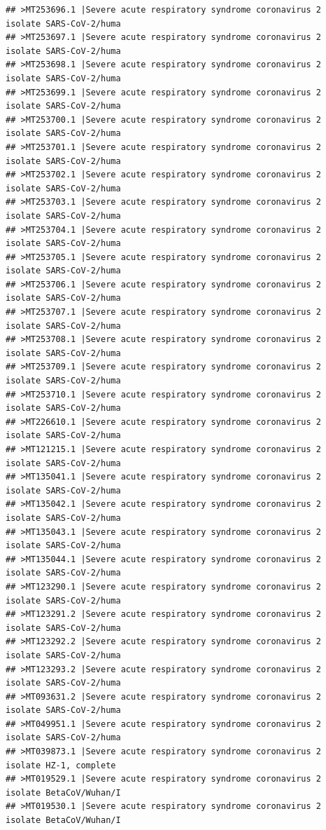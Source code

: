 \documentclass[
]{book}
\begin{document}
\begin{verbatim}
## >MT253696.1 |Severe acute respiratory syndrome coronavirus 2 isolate SARS-CoV-2/huma
## >MT253697.1 |Severe acute respiratory syndrome coronavirus 2 isolate SARS-CoV-2/huma
## >MT253698.1 |Severe acute respiratory syndrome coronavirus 2 isolate SARS-CoV-2/huma
## >MT253699.1 |Severe acute respiratory syndrome coronavirus 2 isolate SARS-CoV-2/huma
## >MT253700.1 |Severe acute respiratory syndrome coronavirus 2 isolate SARS-CoV-2/huma
## >MT253701.1 |Severe acute respiratory syndrome coronavirus 2 isolate SARS-CoV-2/huma
## >MT253702.1 |Severe acute respiratory syndrome coronavirus 2 isolate SARS-CoV-2/huma
## >MT253703.1 |Severe acute respiratory syndrome coronavirus 2 isolate SARS-CoV-2/huma
## >MT253704.1 |Severe acute respiratory syndrome coronavirus 2 isolate SARS-CoV-2/huma
## >MT253705.1 |Severe acute respiratory syndrome coronavirus 2 isolate SARS-CoV-2/huma
## >MT253706.1 |Severe acute respiratory syndrome coronavirus 2 isolate SARS-CoV-2/huma
## >MT253707.1 |Severe acute respiratory syndrome coronavirus 2 isolate SARS-CoV-2/huma
## >MT253708.1 |Severe acute respiratory syndrome coronavirus 2 isolate SARS-CoV-2/huma
## >MT253709.1 |Severe acute respiratory syndrome coronavirus 2 isolate SARS-CoV-2/huma
## >MT253710.1 |Severe acute respiratory syndrome coronavirus 2 isolate SARS-CoV-2/huma
## >MT226610.1 |Severe acute respiratory syndrome coronavirus 2 isolate SARS-CoV-2/huma
## >MT121215.1 |Severe acute respiratory syndrome coronavirus 2 isolate SARS-CoV-2/huma
## >MT135041.1 |Severe acute respiratory syndrome coronavirus 2 isolate SARS-CoV-2/huma
## >MT135042.1 |Severe acute respiratory syndrome coronavirus 2 isolate SARS-CoV-2/huma
## >MT135043.1 |Severe acute respiratory syndrome coronavirus 2 isolate SARS-CoV-2/huma
## >MT135044.1 |Severe acute respiratory syndrome coronavirus 2 isolate SARS-CoV-2/huma
## >MT123290.1 |Severe acute respiratory syndrome coronavirus 2 isolate SARS-CoV-2/huma
## >MT123291.2 |Severe acute respiratory syndrome coronavirus 2 isolate SARS-CoV-2/huma
## >MT123292.2 |Severe acute respiratory syndrome coronavirus 2 isolate SARS-CoV-2/huma
## >MT123293.2 |Severe acute respiratory syndrome coronavirus 2 isolate SARS-CoV-2/huma
## >MT093631.2 |Severe acute respiratory syndrome coronavirus 2 isolate SARS-CoV-2/huma
## >MT049951.1 |Severe acute respiratory syndrome coronavirus 2 isolate SARS-CoV-2/huma
## >MT039873.1 |Severe acute respiratory syndrome coronavirus 2 isolate HZ-1, complete
## >MT019529.1 |Severe acute respiratory syndrome coronavirus 2 isolate BetaCoV/Wuhan/I
## >MT019530.1 |Severe acute respiratory syndrome coronavirus 2 isolate BetaCoV/Wuhan/I

\end{verbatim}
\end{document}
